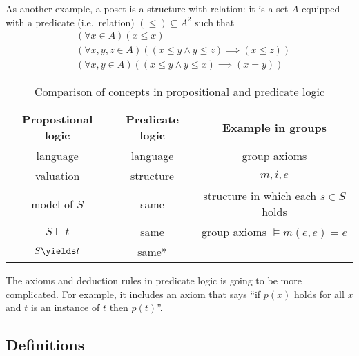 \documentclass[a4paper]{article}
\begin{document}
As another example, a poset is a structure with relation: it is a set \(A\) equipped with a predicate (i.e.\ relation) \((\leq) \subseteq A^2\) such that
\begin{align*}
  & (\forall x \in A) (x \leq x) \\
  & (\forall x, y, z \in A) ((x \leq y \land y \leq z) \implies (x \leq z)) \\
  & (\forall x, y \in A) ((x \leq y \land y \leq x) \implies (x = y))
\end{align*}

\begin{table}[ht]
  \centering
  \begin{tabular}{|c|c|c|}
    \hline
    Propostional logic & Predicate logic & Example in groups \\ \hline
    language & language & group axioms \\ \hline
    valuation & structure & \(m, i, e\) \\ \hline
    model of \(S\) & same & structure in which each \(s \in S\) holds \\ \hline
    \(S \models t\) & same & group axioms \(\models m(e, e) = e\) \\ \hline
    \(S \yields t\) & same* & \\ \hline
  \end{tabular}
  \caption{Comparison of concepts in propositional and predicate logic}
\end{table}

The axioms and deduction rules in predicate logic is going to be more complicated. For example, it includes an axiom that says ``if \(p(x)\) holds for all \(x\) and \(t\) is an instance of \(t\) then \(p(t)\)''.

\subsection{Definitions}
\end{document}
